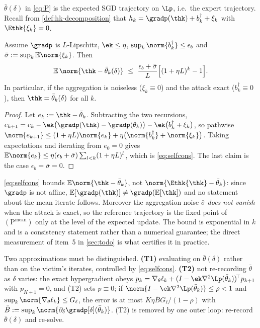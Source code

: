 $\bar\theta(\delta)$ in \cref{eq:P} is the expected SGD trajectory on $\Lp$, i.e.\ the expert trajectory. Recall from \cref{def:hk-decomposition} that $h_k=\gradp(\thk)+b_k^\dagger+\xi_k$ with $\Ethk{\xi_k}=0$.

\begin{proposition}
\label{prop:selfcons}
Assume $\gradp$ is $L$-Lipschitz, $\ek\le\eta$, $\sup_k\norm{b_k^\dagger}\le\epsilon_b$ and $\bar\sigma:=\sup_k\mathbb{E}\norm{\xi_k}$. Then
\begin{equation}
\mathbb{E}\,\norm{\thk-\bar\theta_k(\delta)}\ \le\ \frac{\epsilon_b+\bar\sigma}{L}\Big[(1+\eta L)^k-1\Big].
\label{eq:selfcons}
\end{equation}
In particular, if the aggregation is noiseless ($\xi_k\equiv0$) and the attack exact ($b_k^\dagger\equiv0$), then $\thk=\bar\theta_k(\delta)$ for all $k$.
\end{proposition}
\begin{proof}
Let $e_k:=\thk-\bar\theta_k$. Subtracting the two recursions,
$e_{k+1}=e_k-\ek\big(\gradp(\thk)-\gradp(\bar\theta_k)\big)-\ek\big(b_k^\dagger+\xi_k\big)$,
so pathwise $\norm{e_{k+1}}\le(1+\eta L)\norm{e_k}+\eta\big(\norm{b_k^\dagger}+\norm{\xi_k}\big)$. Taking expectations and iterating from $e_0=0$ gives $\mathbb{E}\norm{e_k}\le\eta(\epsilon_b+\bar\sigma)\sum_{l<k}(1+\eta L)^l$, which is \cref{eq:selfcons}. The last claim is the case $\epsilon_b=\bar\sigma=0$.
\end{proof}

\begin{remark}
\label{rem:selfcons-scope}
\cref{eq:selfcons} bounds $\mathbb{E}\norm{\thk-\bar\theta_k}$, not $\norm{\Ethk{\thk}-\bar\theta_k}$: since $\gradp$ is not affine, $\mathbb{E}[\gradp(\thk)]\neq\gradp(\mathbb{E}[\thk])$ and no statement about the mean iterate follows. Moreover the aggregation noise $\bar\sigma$ \emph{does not vanish} when the attack is exact, so the reference trajectory is the fixed point of $(\mathrm{P}^{\mathrm{mean}})$ only at the level of the expected update. The bound is exponential in $k$ and is a consistency statement rather than a numerical guarantee; the direct measurement of item~5 in \cref{sec:todo} is what certifies it in practice.
\end{remark}

Two approximations must be distinguished. \textbf{(T1)} evaluating on $\bar\theta(\delta)$ rather than on the victim's iterates, controlled by \cref{eq:selfcons}. \textbf{(T2)} not re-recording $\bar\theta$ as $\delta$ varies: the exact hypergradient obeys $p_k=\nabla_\theta\ell_k+(I-\ek\nabla^2\Lp(\bar\theta_k))^{\!\top}p_{k+1}$ with $p_{K+1}=0$, and (T2) sets $p\equiv0$; if $\norm{I-\ek\nabla^2\Lp(\bar\theta_k)}\le\rho<1$ and $\sup_k\norm{\nabla_\theta\ell_k}\le G_\ell$, the error is at most $K\eta\bar BG_\ell/(1-\rho)$ with $\bar B:=\sup_k\norm{\partial_\delta\gradp[\delta](\bar\theta_k)}$. (T2) is removed by one outer loop: re-record $\bar\theta(\delta)$ and re-solve.

